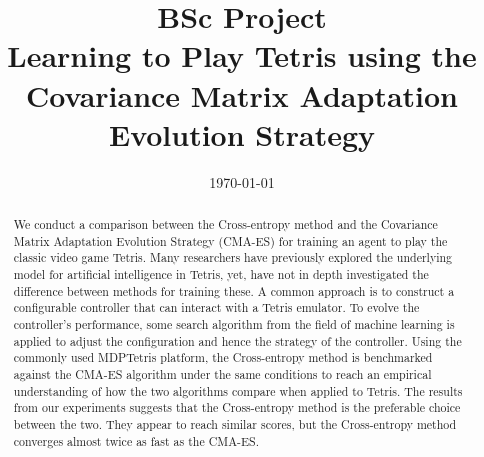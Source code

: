







%
    

\title{BSc Project\\\textbf{Learning to Play Tetris using
    the Covariance Matrix Adaptation
    Evolution Strategy}}
\date{\today}

\thispagestyle{empty}
\begin{abstract}
We conduct a comparison between 
the Cross-entropy method and the Covariance Matrix Adaptation
Evolution Strategy (CMA-ES) for training 
an agent to play the classic video game Tetris. Many researchers have 
previously explored the underlying model for artificial intelligence 
in Tetris, yet, have not in depth investigated the difference 
between methods for training these.
A common approach is to construct a configurable controller that 
can interact with a Tetris emulator. To evolve the controller's performance, 
some search algorithm from the field of machine learning is applied to adjust the configuration and hence the strategy of the controller. Using the 
commonly used MDPTetris \citep{mdptetris} platform, the Cross-entropy
method is benchmarked against the CMA-ES algorithm under the same
conditions to reach an empirical understanding of how the two algorithms
compare when applied to Tetris. The results from our experiments
suggests that the Cross-entropy method is the preferable choice
between the two. They appear to reach similar scores, 
but the Cross-entropy method converges almost twice as
fast as the CMA-ES.\\
\\


\end{abstract}
